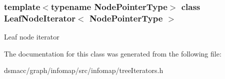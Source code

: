 \subsubsection*{template$<$typename Node\+Pointer\+Type$>$\newline
class Leaf\+Node\+Iterator$<$ Node\+Pointer\+Type $>$}

Leaf node iterator 

The documentation for this class was generated from the following file\+:\begin{DoxyCompactItemize}
\item 
dsmacc/graph/infomap/src/infomap/tree\+Iterators.\+h\end{DoxyCompactItemize}
